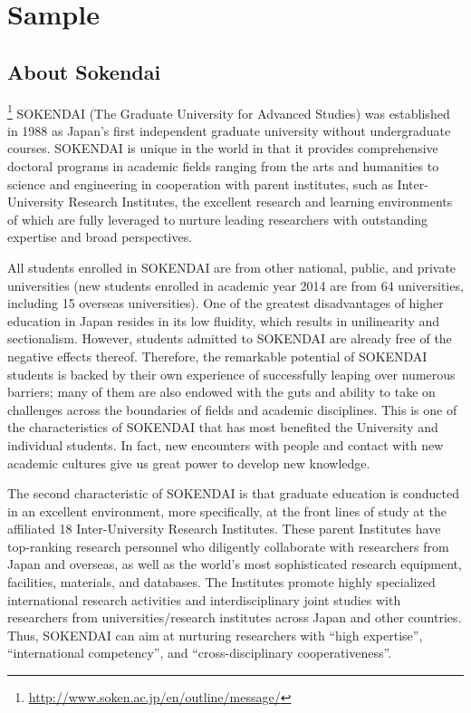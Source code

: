 \chapter{Sample}\label{chapter:sample}

\graphicspath{{Manuscript/Sample/Figs/}}

\section{About Sokendai}

\footnote{\url{http://www.soken.ac.jp/en/outline/message/}}
SOKENDAI (The Graduate University for Advanced Studies) was established in 1988 as Japan's first independent graduate university without undergraduate courses. SOKENDAI is unique in the world in that it provides comprehensive doctoral programs in academic fields ranging from the arts and humanities to science and engineering in cooperation with parent institutes, such as Inter-University Research Institutes, the excellent research and learning environments of which are fully leveraged to nurture leading researchers with outstanding expertise and broad perspectives.

All students enrolled in SOKENDAI are from other national, public, and private universities (new students enrolled in academic year 2014 are from 64 universities, including 15 overseas universities). One of the greatest disadvantages of higher education in Japan resides in its low fluidity, which results in unilinearity and sectionalism. However, students admitted to SOKENDAI are already free of the negative effects thereof. Therefore, the remarkable potential of SOKENDAI students is backed by their own experience of successfully leaping over numerous barriers; many of them are also endowed with the guts and ability to take on challenges across the boundaries of fields and academic disciplines. This is one of the characteristics of SOKENDAI that has most benefited the University and individual students. In fact, new encounters with people and contact with new academic cultures give us great power to develop new knowledge.

The second characteristic of SOKENDAI is that graduate education is conducted in an excellent environment, more specifically, at the front lines of study at the affiliated 18 Inter-University Research Institutes. These parent Institutes have top-ranking research personnel who diligently collaborate with researchers from Japan and overseas, as well as the world's most sophisticated research equipment, facilities, materials, and databases. The Institutes promote highly specialized international research activities and interdisciplinary joint studies with researchers from universities/research institutes across Japan and other countries. Thus, SOKENDAI can aim at nurturing researchers with ``high expertise'', ``international competency'', and ``cross-disciplinary cooperativeness''.

